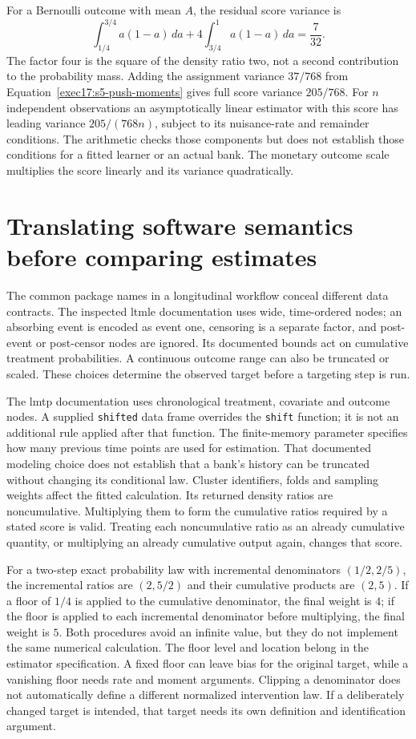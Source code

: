 For a Bernoulli outcome with mean $A$, the residual score variance is
\[
 \int_{1/4}^{3/4}a(1-a)\,da+
 4\int_{3/4}^1a(1-a)\,da=\frac7{32}.
\]
The factor four is the square of the density ratio two, not a second
contribution to the probability mass. Adding the assignment variance
$37/768$ from Equation~\eqref{exec17:s5-push-moments} gives full score
variance $205/768$. For $n$ independent observations an asymptotically
linear estimator with this score has leading variance $205/(768n)$,
subject to its nuisance-rate and remainder conditions. The arithmetic
checks those components but does not establish those conditions for a
fitted learner or an actual bank. The monetary outcome scale multiplies
the score linearly and its variance quadratically.\citep{exec17_s5_math}

\section{Translating software semantics before comparing estimates}
\label{exec17:s5-software}

The common package names in a longitudinal workflow conceal different data
contracts. The inspected ltmle documentation uses wide, time-ordered nodes;
an absorbing event is encoded as event one, censoring is a separate factor,
and post-event or post-censor nodes are ignored. Its documented bounds act on
cumulative treatment probabilities. A continuous outcome range can also be
truncated or scaled. These choices determine the observed target before a
targeting step is run.\citep{sw_ltmle}

The lmtp documentation uses chronological treatment, covariate and outcome
nodes. A supplied \texttt{shifted} data frame overrides the \texttt{shift}
function; it is not an additional rule applied after that function. The
finite-memory parameter specifies how many previous time points are used
for estimation. That documented modeling choice does not establish that a
bank's history can be truncated without changing its conditional law.
Cluster identifiers, folds and sampling weights affect the fitted calculation.
Its returned density ratios are noncumulative. Multiplying them to form the
cumulative ratios required by a stated score is valid. Treating each
noncumulative ratio as an already cumulative quantity, or multiplying an
already cumulative output again, changes that score.\citep{sw_lmtp}

For a two-step exact probability law with incremental denominators
$(1/2,2/5)$, the incremental ratios are $(2,5/2)$ and their cumulative
products are $(2,5)$. If a floor of $1/4$ is applied to the cumulative
denominator, the final weight is $4$; if the floor is applied to each
incremental denominator before multiplying, the final weight is $5$. Both
procedures avoid an infinite value, but they do not implement the same
numerical calculation. The floor level and location belong in the estimator
specification. A fixed floor can leave bias for the original target, while
a vanishing floor needs rate and moment arguments. Clipping a denominator
does not automatically define a different normalized intervention law.
If a deliberately changed target is intended, that target needs its own
definition and identification argument.\citep{exec17_s5_math}


